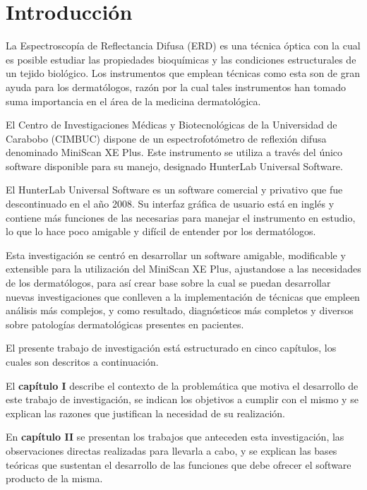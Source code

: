 \chapter*{Introducci\'{o}n}

	La Espectroscop\'{i}a de Reflectancia Difusa (ERD) es una t\'{e}cnica \'{o}ptica con la cual es  posible estudiar las propiedades bioqu\'{i}micas y las condiciones estructurales de un tejido biol\'{o}gico. Los instrumentos que emplean t\'{e}cnicas como esta son de gran ayuda para los dermat\'{o}logos, raz\'{o}n por la cual tales instrumentos han tomado suma importancia en el \'{a}rea de la medicina dermatol\'{o}gica.

El Centro de Investigaciones M\'{e}dicas y Biotecnol\'{o}gicas de la Universidad de Carabobo (CIMBUC) dispone de un espectrofot\'{o}metro de reflexi\'{o}n difusa denominado MiniScan XE Plus. Este instrumento se utiliza a trav\'{e}s del \'{u}nico software disponible para su manejo, designado HunterLab Universal Software.

El HunterLab Universal Software es un software comercial y privativo que fue descontinuado en el a\~{n}o 2008. Su interfaz gr\'{a}fica de usuario est\'{a} en ingl\'{e}s y contiene m\'{a}s funciones de las necesarias para manejar el instrumento en estudio, lo que lo hace poco amigable y dif\'{i}cil de entender por los dermat\'{o}logos.

Esta investigaci\'{o}n se centr\'{o} en desarrollar un software amigable, modificable y extensible para la utilizaci\'{o}n del MiniScan XE Plus, ajustandose a las necesidades de los dermat\'{o}logos, para as\'{i} crear base sobre la cual se puedan desarrollar nuevas investigaciones que conlleven a la implementaci\'{o}n de t\'{e}cnicas que empleen an\'{a}lisis m\'{a}s complejos, y como resultado, diagn\'{o}sticos m\'{a}s completos y diversos sobre patolog\'{i}as dermatol\'{o}gicas presentes en pacientes.

\newpage

	El presente trabajo de investigaci\'{o}n est\'{a} estructurado en cinco cap\'{i}tulos, los cuales son descritos a continuaci\'{o}n.

	El \textbf{cap\'{i}tulo I} describe el contexto de la problem\'{a}tica que motiva el desarrollo de este trabajo de investigaci\'{o}n, se indican los objetivos a cumplir con el mismo y se explican las razones que justifican la necesidad de su realizaci\'{o}n.

	En \textbf{cap\'{i}tulo II} se presentan los trabajos que anteceden esta investigaci\'{o}n, las observaciones directas realizadas para llevarla a cabo, y se explican las bases te\'{o}ricas que sustentan el desarrollo de las funciones que debe ofrecer el software producto de la misma.


